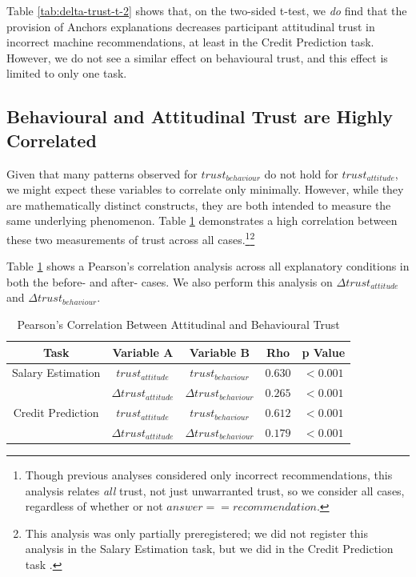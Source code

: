 Table \ref{tab:delta-trust-t-2} shows that, on the two-sided t-test, we \textit{do} find that the provision of Anchors explanations decreases participant attitudinal trust in incorrect machine recommendations, at least in the Credit Prediction task. However, we do not see a similar effect on behavioural trust, and this effect is limited to only one task. 

\subsection{Behavioural and Attitudinal Trust are Highly Correlated}\label{ssec:trust-corr}
Given that many patterns observed for $trust_{behaviour}$ do not hold for $trust_{attitude}$, we might expect these variables to correlate only minimally. However, while they are mathematically distinct constructs, they are both intended to measure the same underlying phenomenon. Table \ref{tab:trust-correlation} demonstrates a high correlation between these two measurements of trust across all cases.\footnote{Though previous analyses considered only incorrect recommendations, this analysis relates \textit{all} trust, not just unwarranted trust, so we consider all cases, regardless of whether or not $answer == recommendation$.}\footnote{This analysis was only partially preregistered; we did not register this analysis in the Salary Estimation task, but we did in the Credit Prediction task \cite{natarajan_binns_2022}.}

Table \ref{tab:trust-correlation} shows a Pearson's correlation analysis across all explanatory conditions in both the before- and after- cases. We also perform this analysis on $\Delta trust_{attitude}$ and $\Delta trust_{behaviour}$.

\begin{table}[htbp]
    \caption{Pearson's Correlation Between Attitudinal and Behavioural Trust}
    \begin{center}
    \begin{tabular}{ccccc}
        \toprule
        Task & Variable A & Variable B & Rho & p Value \\
        \midrule
        Salary Estimation & $trust_{attitude}$ & $trust_{behaviour}$ & $\mathbf{0.630}$ & $\mathbf{<0.001}$ \\
        & $\Delta trust_{attitude}$ & $\Delta trust_{behaviour}$ & $\mathbf{0.265}$ & $\mathbf{<0.001}$ \\
        \midrule
        Credit Prediction & $trust_{attitude}$ & $trust_{behaviour}$ & $\mathbf{0.612}$ & $\mathbf{<0.001}$ \\
        & $\Delta trust_{attitude}$ & $\Delta trust_{behaviour}$ & $\mathbf{0.179}$ & $\mathbf{<0.001}$ \\
        \bottomrule
    \end{tabular}
    \label{tab:trust-correlation}
    \end{center}
\end{table}

